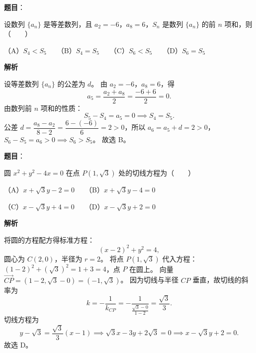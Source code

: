 \begin{answer}

\textbf{题目}：

设数列 $\{a_n\}$ 是等差数列，且 $a_2=-6$，$a_8=6$，$S_n$ 是数列 $\{a_n\}$ 的前 $n$ 项和，则\mbox{（　　）}

（A）$S_4<S_5$　　（B）$S_4=S_5$　　（C）$S_6<S_5$　　（D）$S_6=S_5$

\textbf{解析}

设等差数列 $\{a_n\}$ 的公差为 $d$。
由 $a_2=-6$，$a_8=6$，得
\nopagebreak[4]
\[
a_5=\frac{a_2+a_8}{2}=\frac{-6+6}{2}=0.
\]
由数列前 $n$ 项和的性质：
\nopagebreak[4]
\[
S_5-S_4=a_5=0 \implies S_4=S_5.
\]
公差 $d=\dfrac{a_8-a_2}{8-2}=\dfrac{6-(-6)}{6}=2>0$，所以 $a_6=a_5+d=2>0$，$S_6-S_5=a_6>0 \implies S_6>S_5$。
故选 B。


\end{answer}
\begin{answer}

\textbf{题目}：

圆 $x^2+y^2-4x=0$ 在点 $P(1,\sqrt{3})$ 处的切线方程为\mbox{（　　）}

（A）$x+\sqrt{3}y-2=0$　　（B）$x+\sqrt{3}y-4=0$

（C）$x-\sqrt{3}y+4=0$　　（D）$x-\sqrt{3}y+2=0$

\textbf{解析}

将圆的方程配方得标准方程：
\nopagebreak[4]
\[
(x-2)^2+y^2=4,
\]
圆心为 $C(2,0)$，半径为 $r=2$。
将点 $P(1,\sqrt{3})$ 代入方程：$(1-2)^2+(\sqrt{3})^2=1+3=4$，点 $P$ 在圆上。
向量 $\overrightarrow{CP}=(1-2,\sqrt{3}-0)=(-1,\sqrt{3})$。
因为切线与半径 $CP$ 垂直，故切线的斜率为
\nopagebreak[4]
\[
k=-\frac{1}{k_{CP}}=-\frac{1}{\frac{\sqrt{3}-0}{1-2}}=\frac{\sqrt{3}}{3}.
\]
切线方程为
\nopagebreak[4]
\[
y-\sqrt{3}=\frac{\sqrt{3}}{3}(x-1) \implies \sqrt{3}x-3y+2\sqrt{3}=0 \implies x-\sqrt{3}y+2=0.
\]
故选 D。


\end{answer}
